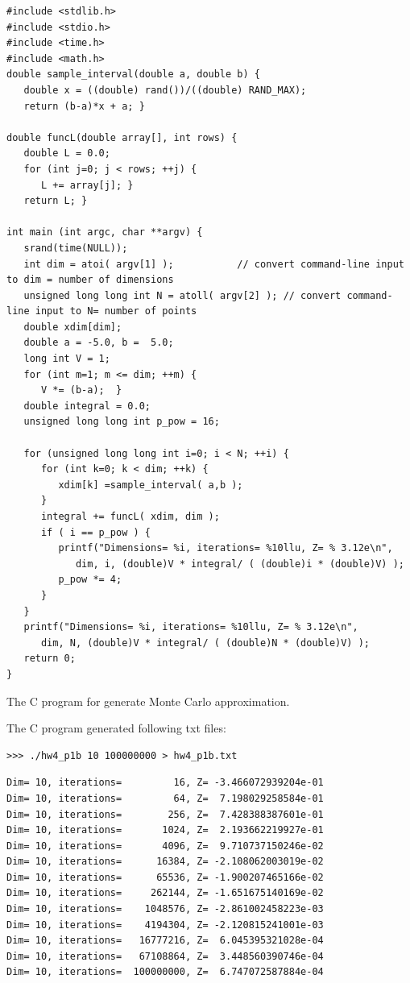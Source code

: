 \documentclass{article}
\begin{document}
\begin{program}
	\begin{verbatim}
#include <stdlib.h>
#include <stdio.h>
#include <time.h>
#include <math.h>
double sample_interval(double a, double b) {
   double x = ((double) rand())/((double) RAND_MAX);
   return (b-a)*x + a; }

double funcL(double array[], int rows) {
   double L = 0.0;
   for (int j=0; j < rows; ++j) {
      L += array[j]; }
   return L; }

int main (int argc, char **argv) {
   srand(time(NULL));
   int dim = atoi( argv[1] );           // convert command-line input to dim = number of dimensions
   unsigned long long int N = atoll( argv[2] ); // convert command-line input to N= number of points
   double xdim[dim];
   double a = -5.0, b =  5.0;
   long int V = 1;
   for (int m=1; m <= dim; ++m) {
      V *= (b-a);  }
   double integral = 0.0;
   unsigned long long int p_pow = 16;

   for (unsigned long long int i=0; i < N; ++i) {
      for (int k=0; k < dim; ++k) {
         xdim[k] =sample_interval( a,b );
      }
      integral += funcL( xdim, dim );
      if ( i == p_pow ) {
         printf("Dimensions= %i, iterations= %10llu, Z= % 3.12e\n",
            dim, i, (double)V * integral/ ( (double)i * (double)V) );
         p_pow *= 4;
      }
   }
   printf("Dimensions= %i, iterations= %10llu, Z= % 3.12e\n",
      dim, N, (double)V * integral/ ( (double)N * (double)V) );
   return 0;
}
	\end{verbatim}
	\caption{The C program for generate  Monte Carlo approximation.}
\end{program}


The C program generated following txt files: 
\begin{lstlisting}
>>> ./hw4_p1b 10 100000000 > hw4_p1b.txt          
\end{lstlisting}
\begin{lstlisting}
Dim= 10, iterations=         16, Z= -3.466072939204e-01
Dim= 10, iterations=         64, Z=  7.198029258584e-01
Dim= 10, iterations=        256, Z=  7.428388387601e-01
Dim= 10, iterations=       1024, Z=  2.193662219927e-01
Dim= 10, iterations=       4096, Z=  9.710737150246e-02
Dim= 10, iterations=      16384, Z= -2.108062003019e-02
Dim= 10, iterations=      65536, Z= -1.900207465166e-02
Dim= 10, iterations=     262144, Z= -1.651675140169e-02
Dim= 10, iterations=    1048576, Z= -2.861002458223e-03
Dim= 10, iterations=    4194304, Z= -2.120815241001e-03
Dim= 10, iterations=   16777216, Z=  6.045395321028e-04
Dim= 10, iterations=   67108864, Z=  3.448560390746e-04
Dim= 10, iterations=  100000000, Z=  6.747072587884e-04
\end{lstlisting}
\end{document}
